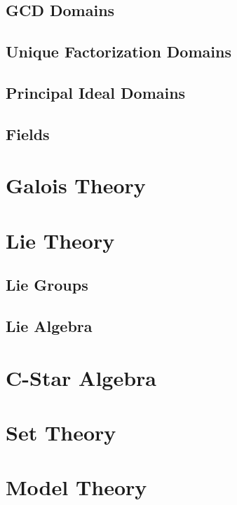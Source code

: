\documentclass[12pt, english]{book}
\begin{document}
	\chapter{GCD Domains} \label{GCD Domains Chapter - Abstract Algebra}
	
	\chapter{Unique Factorization Domains} \label{Unique Factorization Domains Chapter - Abstract Algebra}
	
	\chapter{Principal Ideal Domains} \label{Principal Ideal Domains Chapter - Abstract Algebra}
	
	\chapter{Fields} \label{Fields Chapter - Abstract Algebra}
	
	
	\part{Galois Theory} \label{Galois Theory Part}
	
	\part{Lie Theory} \label{Lie Algebra Part}
	
	\chapter{Lie Groups}
	
	\chapter{Lie Algebra}
	
	\part{C-Star Algebra} \label{C-Star Algebra Part}
	
	\part{Set Theory} \label{Set Theory Part}
	
	\part{Model Theory} \label{Model Theory Part}
	
\end{document}
